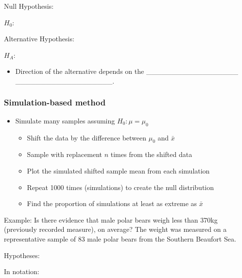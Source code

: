 \documentclass[
]{report}
\providecommand{\tightlist}{%
  \setlength{\itemsep}{0pt}\setlength{\parskip}{0pt}}
\begin{document}

Null Hypothesis:

\(H_0:\)

\vspace{0.2in}

Alternative Hypothesis:

\(H_A:\)

\vspace{0.2in}


\begin{itemize}
\tightlist
\item
  Direction of the alternative depends on the \_\_\_\_\_\_\_\_\_\_\_\_\_\_\_\_\_\_
  \_\_\_\_\_\_\_\_\_\_\_\_\_\_\_\_\_\_\_.
\end{itemize}


\subsubsection*{Simulation-based method}\label{simulation-based-method}

\begin{itemize}
\item
  Simulate many samples assuming \(H_0: \mu = \mu_0\)

  \begin{itemize}
  \item
    Shift the data by the difference between \(\mu_0\) and \(\bar{x}\)
  \item
    Sample with replacement \(n\) times from the shifted data
  \item
    Plot the simulated shifted sample mean from each simulation
  \item
    Repeat 1000 times (simulations) to create the null distribution
  \item
    Find the proportion of simulations at least as extreme as \(\bar{x}\)
  \end{itemize}
\end{itemize}

Example: Is there evidence that male polar bears weigh less than 370kg (previously recorded measure), on average? The weight was measured on a representative sample of 83 male polar bears from the Southern Beaufort Sea.

Hypotheses:

In notation:
\end{document}

